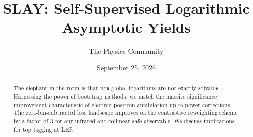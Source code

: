 \documentclass[11pt]{article}
\title{SLAY: Self-Supervised Logarithmic Asymptotic Yields}
\author{The Physics Community}
\date{September 25, 2026}
\begin{document}
\maketitle
\begin{abstract}
The elephant in the room is that non-global logarithms are not exactly
solvable. Harnessing the power of bootstrap methods, we match the
massive significance improvement characteristic of electron-positron
annihilation up to power corrections. The zero-bin-subtracted loss
landscape improves on the contrastive reweighting scheme by a factor of
3 for any infrared and collinear safe observable. We discuss
implications for top tagging at LEP.
\end{abstract}
\tableofcontents




\nocite{*}


\end{document}
